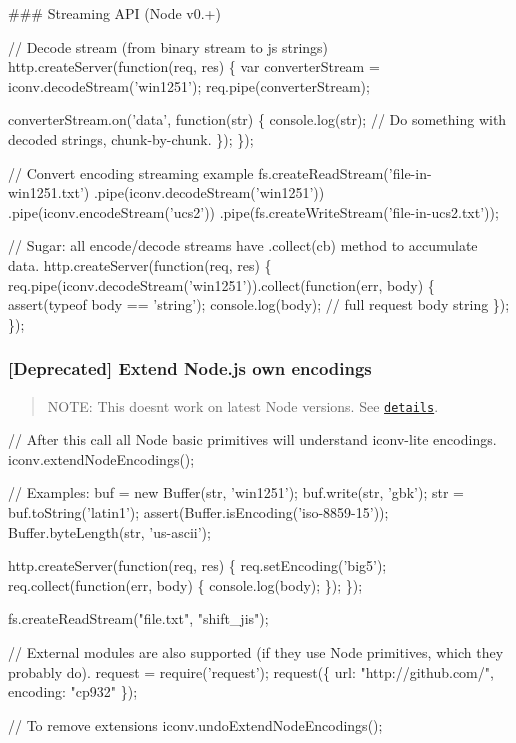 \#\#\# Streaming A\+PI (Node v0.+) 
\begin{DoxyCode}
// Decode stream (from binary stream to js strings)
http.createServer(function(req, res) \{
    var converterStream = iconv.decodeStream('win1251');
    req.pipe(converterStream);

    converterStream.on('data', function(str) \{
        console.log(str); // Do something with decoded strings, chunk-by-chunk.
    \});
\});

// Convert encoding streaming example
fs.createReadStream('file-in-win1251.txt')
    .pipe(iconv.decodeStream('win1251'))
    .pipe(iconv.encodeStream('ucs2'))
    .pipe(fs.createWriteStream('file-in-ucs2.txt'));

// Sugar: all encode/decode streams have .collect(cb) method to accumulate data.
http.createServer(function(req, res) \{
    req.pipe(iconv.decodeStream('win1251')).collect(function(err, body) \{
        assert(typeof body == 'string');
        console.log(body); // full request body string
    \});
\});
\end{DoxyCode}


\subsubsection*{\mbox{[}Deprecated\mbox{]} Extend Node.\+js own encodings}

\begin{quote}
N\+O\+TE\+: This doesn\textquotesingle{}t work on latest Node versions. See \href{https://github.com/ashtuchkin/iconv-lite/wiki/Node-v4-compatibility}{\tt details}. \end{quote}



\begin{DoxyCode}
// After this call all Node basic primitives will understand iconv-lite encodings.
iconv.extendNodeEncodings();

// Examples:
buf = new Buffer(str, 'win1251');
buf.write(str, 'gbk');
str = buf.toString('latin1');
assert(Buffer.isEncoding('iso-8859-15'));
Buffer.byteLength(str, 'us-ascii');

http.createServer(function(req, res) \{
    req.setEncoding('big5');
    req.collect(function(err, body) \{
        console.log(body);
    \});
\});

fs.createReadStream("file.txt", "shift\_jis");

// External modules are also supported (if they use Node primitives, which they probably do).
request = require('request');
request(\{
    url: "http://github.com/", 
    encoding: "cp932"
\});

// To remove extensions
iconv.undoExtendNodeEncodings();
\end{DoxyCode}


